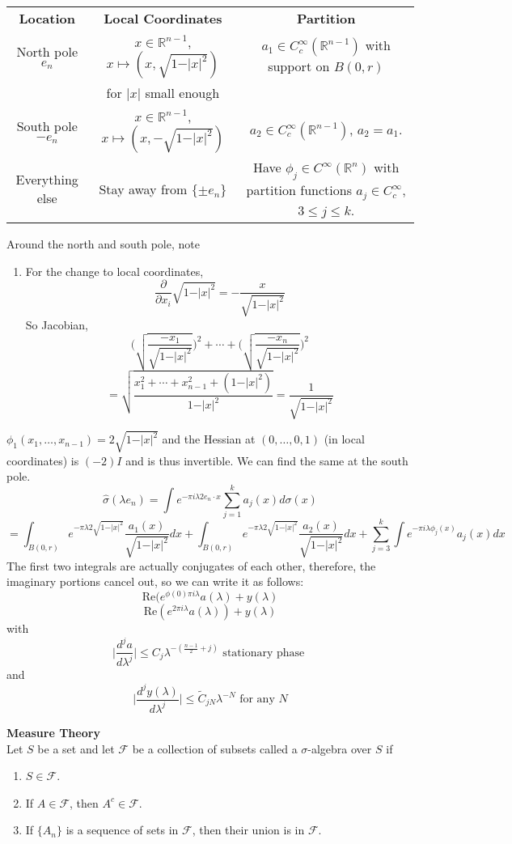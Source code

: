 \documentclass[12pt]{article}
\begin{document}
\begin{tabular}{c c c}
\textbf{Location} & \textbf{Local Coordinates} & \textbf{Partition} \\
North pole $e_n$ & $x \in \mathbb{R}^{n-1}$, $x \mapsto (x, \sqrt{1-\vert x \vert^2})$  & $a_1 \in C^\infty_c(\mathbb{R}^{n-1})$ with support on $B(0,r)$ \\ 
& for $\vert x \vert$ small enough & \\
South pole $-e_n$ & $x \in \mathbb{R}^{n-1}$, $x \mapsto (x, -\sqrt{1-\vert x \vert^2})$ & $a_2 \in C^\infty_c(\mathbb{R}^{n-1})$, $a_2 =a_1$. \\
Everything else & Stay away from $\{\pm e_n\}$ & Have $\phi_j \in C^\infty(\mathbb{R}^n)$ with partition functions $a_j \in C^\infty_c$, $3\leq j \leq k$.
\end{tabular}
Around the north and south pole, note
\begin{enumerate}
\item For the change to local coordinates,
$$\frac{\partial}{\partial x_i} \sqrt{1-\vert x \vert^2} = -\frac{x}{\sqrt{1-\vert x \vert^2}}$$
So Jacobian,
$$\Big(\sqrt{\frac{-x_1}{\sqrt{1-\vert x \vert^2}}}\Big)^2 + \cdots + \Big(\sqrt{\frac{-x_n}{\sqrt{1-\vert x \vert^2}}}\Big)^2$$
$$= \sqrt{\frac{x_1^2+ \cdots +x^2_{n-1} + (1-\vert x \vert^2)}{1 - \vert x \vert^2}} = \frac{1}{\sqrt{1- \vert x \vert^2}}$$
\end{enumerate}

$\phi_1(x_1, \dots, x_{n-1}) = 2\sqrt{1-\vert x\vert^2}$ and the Hessian at $(0, \dots, 0, 1)$ (in local coordinates) is $(-2)I$ and is thus invertible. We can find the same at the south pole.
$$ \hat{\sigma}(\lambda e_n)  = \int e^{-\pi i \lambda 2 e_n \cdot x} \sum^k_{j=1}a_j(x) d\sigma(x)$$
$$= \int_{B(0,r)} e^{-\pi \lambda 2 \sqrt{1-\vert x \vert^2}} \frac{a_1(x)}{\sqrt{1-\vert x \vert^2}} dx + \int_{B(0,r)} e^{-\pi \lambda 2 \sqrt{1-\vert x \vert^2}} \frac{a_2(x)}{\sqrt{1-\vert x \vert^2}} dx + \sum^k_{j=3} \int e^{-\pi i \lambda \phi_j(x)} a_j(x) dx$$
The first two integrals are actually conjugates of each other, therefore, the imaginary portions cancel out, so we can write it as follows:
$$\text{Re}(e^{\phi(0) \pi i \lambda}a(\lambda) + y(\lambda)$$
$$\text{Re}(e^{2\pi i \lambda}a(\lambda)) + y(\lambda)$$
with
$$\vert \frac{d^ja}{d\lambda^j} \vert \leq C_j \lambda^{-(\frac{n-1}{2} + j)} \text{ stationary phase }$$
and 
$$\vert \frac{d^jy(\lambda)}{d\lambda^j}\vert \leq \tilde{C}_{jN} \lambda^{-N} \text{ for any } N$$

\noindent \textbf{Measure Theory} \\
Let $S$ be a set and let $\mathcal{F}$ be a collection of subsets called a $\sigma$-algebra over $S$ if
\begin{enumerate}
\item $S \in \mathcal{F}$.
\item If $A \in \mathcal{F}$, then $A^c \in \mathcal{F}$.
\item If $\{A_n\}$ is a sequence of sets in $\mathcal{F}$, then their union is in $\mathcal{F}$.
\end{enumerate}
\end{document}
